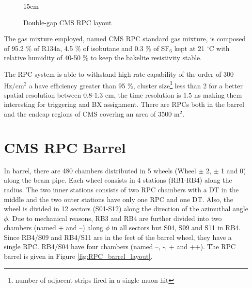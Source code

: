\begin{figure}[!htm]{15cm}
\caption{Double-gap CMS RPC layout}%
\label{fig:RPClayout}
\end{figure}

The gas mixture employed, named CMS RPC standard gas mixture, is composed of 95.2 \% of R134a, 4.5 \% of isobutane and 0.3 \% of SF$_6$ kept at 21 $^\circ$C with relative humidity of 40-50 \% to keep the bakelite resistivity stable. 

The RPC system is able to withstand high rate capability of the order of 300 Hz/cm$^2$ a have efficiency greater than 95 \%, cluster size\footnote{number of adjacent strips fired in a single muon hit} less than 2 for a better spatial resolution between 0.8-1.3 cm, the time resolution is 1.5 ns making them interesting for triggering and BX assignment. There are RPCs both in the barrel and the endcap regions of CMS covering an area of 3500 m$^2$. 

\section{CMS RPC Barrel}

In barrel, there are 480 chambers distributed in 5 wheels (Wheel $\pm$ 2, $\pm$ 1 and 0) along the beam pipe. Each wheel consists in 4 stations (RB1-RB4) along the radius. The two inner stations consists of two RPC chambers with a DT in the middle and the two outer stations have only one RPC and one DT. Also, the wheel is divided in 12 sectors (S01-S12) along the direction of the azimuthal angle $\phi$. Due to mechanical reasons, RB3 and RB4 are further divided into two chambers (named + and –) along $\phi$ in all sectors but S04, S09 and S11 in RB4. Since RB4/S09 and RB4/S11 are in the feet of the barrel wheel, they have a single RPC. RB4/S04 have four chambers (named --, -, + and ++). The RPC barrel is given in Figure \ref{fig:RPC_barrel_layout}.

